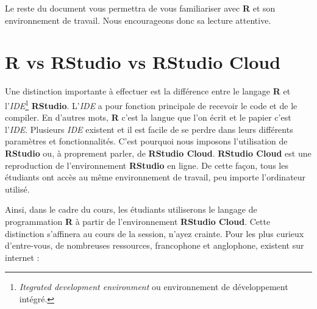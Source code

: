 \documentclass[10.5pt,a4paper]{article}
\begin{document}
Le reste du document vous permettra de vous familiariser avec \textbf{R} et son environnement de travail. Nous encourageons donc sa lecture attentive.

\section{R vs RStudio vs RStudio Cloud}\label{R vs RStudio vs RStudio Cloud}

Une distinction importante à effectuer est la différence entre le langage \textbf{R} et l'\textit{IDE}\footnote{\emph{Itegrated development environment} ou environnement de développement intégré.} \textbf{RStudio}. L'\textit{IDE} a pour fonction principale de recevoir le code et de le compiler. En d'autres mots, \textbf{R} c'est la langue que l'on écrit et le papier c'est l'\textit{IDE}. Plusieurs \textit{IDE} existent et il est facile de se perdre dans leurs différents paramètres et fonctionnalités. C'est pourquoi nous imposons l'utilisation de \textbf{RStudio} ou, à proprement parler, de \textbf{RStudio Cloud}. \textbf{RStudio Cloud} est une reproduction de l'environnement \textbf{RStudio} en ligne. De cette façon, tous les étudiants ont accès au même environnement de travail, peu importe l'ordinateur utilisé.  

Ainsi, dans le cadre du cours, les étudiants utiliserons le langage de programmation \textbf{R} à partir de l'environnement \textbf{RStudio Cloud}. Cette distinction s'affinera au cours de la session, n'ayez crainte. Pour les plus curieux d'entre-vous, de nombreuses ressources, francophone et anglophone, existent sur internet :
\end{document}
